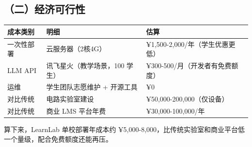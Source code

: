 \documentclass[zihao=-4,a4paper,UTF8,fontset=windows]{ctexart}
\begin{document}
\par\noindent\begin{minipage}{\linewidth}
\subsection{（二）经济可行性}
\par\noindent\begin{tabular}{|p{3.0cm}|p{4.5cm}|p{6.2cm}|}
\hline
\textbf{成本类别} & \textbf{明细} & \textbf{估算} \\ \hline
一次性部署 & 云服务器（2核4G） & ¥1,500-2,000/年（学生优惠更低） \\ \hline
LLM API & 讯飞星火（教学场景，100 学生） & ¥300-500/月（开发者有免费额度） \\ \hline
运维 & 学生团队志愿维护 + 开源工具 & ¥0 \\ \hline
对比传统 & 电路实验室建设 & ¥50,000-200,000（仅设备） \\ \hline
对比传统 & 商业 LMS 平台年费 & ¥30,000-100,000/年 \\ \hline
\end{tabular}\par
\end{minipage}\par


算下来，LearnLab 单校部署年成本约 ¥5,000-8,000，比传统实验室和商业平台低一个量级，配合免费额度还能再压。
\end{document}
